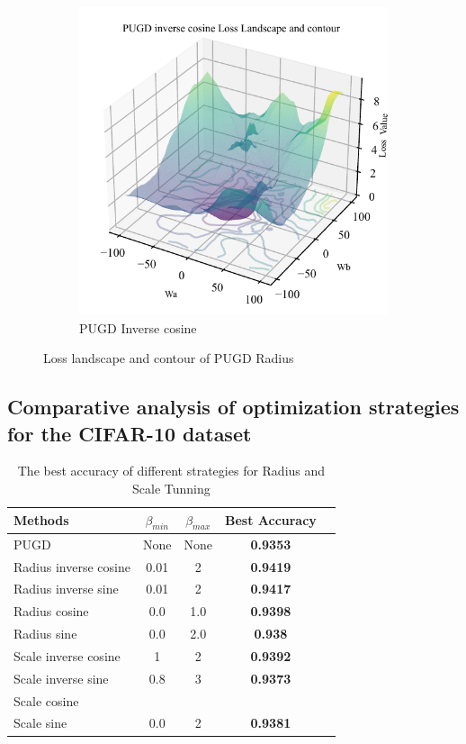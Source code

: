 \documentclass[10pt,twocolumn,letterpaper]{article}
\begin{document}
\begin{figure}[htbp]
  \begin{subfigure}[t]{\columnwidth}
    \includegraphics[width=\linewidth, height=0.7\linewidth]{images/PUGDRICOS_LLC10.pdf} 
    \caption{PUGD Inverse cosine}
    \label{fig:pcos}
  \end{subfigure}
  \caption{Loss landscape and contour of PUGD Radius}
  \label{fig:llc_compare}
\end{figure}

\subsection{Comparative analysis of optimization strategies for the CIFAR-10 dataset}
\label{appendix:cifar10}
\begin{table}[H]
	\begin{center}
		\begin{tabular}{|l|c|c|c|c|}
			\hline
			Methods & $\beta_{min}$ & $\beta_{max}$ & Best Accuracy \\
			\hline
			PUGD	& None & None & \bf{0.9353} \\
			\hline
			Radius inverse cosine &	0.01	&	2	& \bf{0.9419} \\
			Radius inverse sine 	&	0.01	&	2	& \bf{0.9417} \\
			Radius cosine &	0.0	&	1.0	& \bf{0.9398} \\
			Radius sine 	&	0.0	&	2.0	& \bf{0.938} \\
			\hline
			Scale inverse cosine &	1	&	2	& \bf{0.9392} \\
			Scale inverse sine 	&	0.8	&	3	& \bf{0.9373} \\
			Scale cosine &	&	& \bf{} \\
			Scale sine 	&	0.0	&	2	& \bf{0.9381} \\
			\hline
		\end{tabular}
	\end{center}
	\caption{%
		The best accuracy of different strategies for Radius and Scale Tunning
	}
	\label{tab:cifar10}
\end{table}
\end{document}
